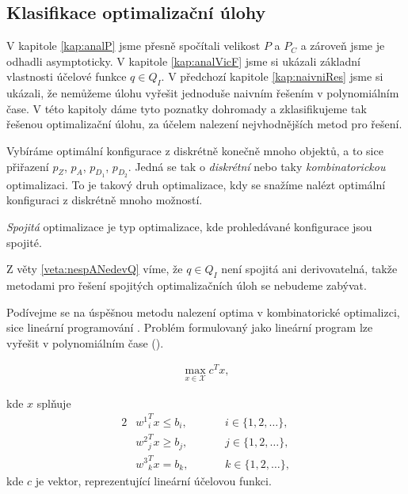 \subsection{Klasifikace optimalizační úlohy}\label{kap:NP}

V kapitole \ref{kap:analP} jsme přesně spočítali velikost $P$ a $P_C$ a zároveň jsme je odhadli asymptoticky.
V kapitole \ref{kap:analVicF} jsme si ukázali základní vlastnosti účelové funkce $q \in Q_I$.
V předchozí kapitole \ref{kap:naivniRes} jsme si ukázali, že nemůžeme úlohu vyřešit jednoduše naivním řešením v polynomiálním čase.
V této kapitoly dáme tyto poznatky dohromady a zklasifikujeme tak řešenou optimalizační úlohu, za účelem nalezení nejvhodnějších metod pro řešení.

Vybíráme optimální konfigurace z diskrétně konečně mnoho objektů, a to sice přiřazení $p_Z$, $p_A$, $p_{D_{1}}$, $p_{D_{2}}$.
Jedná se tak o \textit{diskrétní} nebo taky \textit{kombinatorickou} optimalizaci.
To je takový druh optimalizace, kdy se snažíme nalézt optimální konfiguraci z diskrétně mnoho možností.

\textit{Spojitá} optimalizace je typ optimalizace, kde prohledávané konfigurace jsou spojité.

Z věty \ref{veta:nespANedevQ} víme, že $q \in Q_I$ není spojitá ani derivovatelná, takže metodami pro řešení spojitých optimalizačních úloh se nebudeme zabývat.

Podívejme se na úspěšnou metodu nalezení optima v kombinatorické optimalizci, sice lineární programování \cite{LP}.
Problém formulovaný jako lineární program lze vyřešit v polynomiálním čase (\citet{cohen2020solving}).

\begin{definice}
  \begin{align*}
    \max_{x \in \mathcal{X}} c^T x,
  \end{align*}

  kde $x$ splňuje
  \begin{alignat*}{2}
    & {w^1}^T_i x \leq b_i, && \hspace{20pt} i \in \{ 1, 2, \dots \},\\
    & {w^2}^T_j x \geq b_j, && \hspace{20pt} j \in \{ 1, 2, \dots \},\\
    & {w^3}^T_k x = b_k,    && \hspace{20pt} k \in \{ 1, 2, \dots \},
  \end{alignat*}
  kde $c$ je vektor, reprezentující lineární účelovou funkci.
\end{definice}

